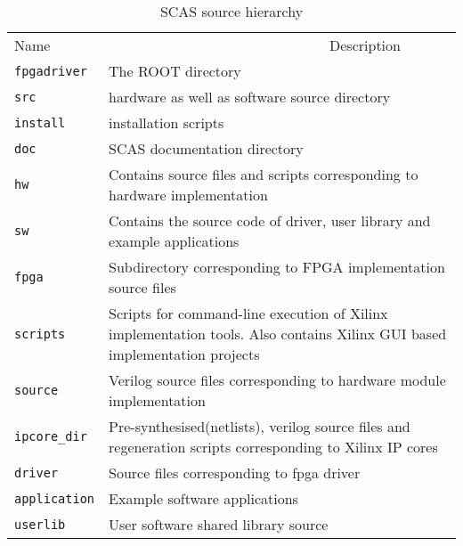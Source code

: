 \begin{longtable}{l|p{9 cm}}
    \caption{SCAS source hierarchy\label{tab:hierarchy}}\\\hline
     Name   &      ~~~~~~~~~~~~~~~~~~~~~~~~~~~~~~~Description \\\arrayrulecolor{ared}\hline
    {\texttt{fpgadriver}}                      &  The ROOT directory   \\\arrayrulecolor{black}\hline
    {\texttt{src}}                             &  hardware as well as software source directory\\\hline
    {\texttt{install}}                         &  installation scripts\\\hline
    {\texttt{doc}}                             &  SCAS documentation directory    \\\hline
    {\texttt{hw}}                              &  Contains source files and scripts corresponding to hardware implementation    \\\hline
    {\texttt{sw}}                              &  Contains the source code of driver, user library and example applications    \\\hline
    {\texttt{fpga}}                            &  Subdirectory corresponding to FPGA implementation source files \\\hline
    {\texttt{scripts}}                         &  Scripts for command-line execution of Xilinx implementation tools. Also contains Xilinx GUI based implementation projects    \\\hline
    {\texttt{source}}                          &  Verilog source files corresponding to hardware module implementation \\\hline
    {\texttt{ipcore\_dir}}                     &  Pre-synthesised(netlists), verilog source files and regeneration scripts corresponding to Xilinx IP cores   \\\hline
    {\texttt{driver}}                          &  Source files corresponding to fpga driver\\\hline
    {\texttt{application}}                     &  Example software applications   \\\hline
    {\texttt{userlib}}                         &  User software shared library source\\\hline
\end{longtable}     